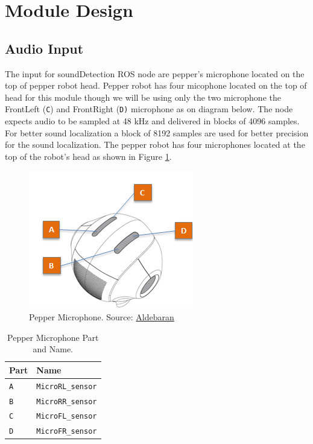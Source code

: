 \documentclass{CSSRforAfrica}
\begin{document}
\section{Module Design}
\subsection*{Audio Input}
The input for soundDetection ROS node are pepper's microphone located on the top of pepper robot head. Pepper robot has four micophone located on the top of head for this module though we will be using only the two microphone the FrontLeft (\texttt{C}) and FrontRight (\texttt{D)} microphone as on diagram below. The node expects audio to be sampled at 48 kHz and delivered in blocks of 4096 samples. For better sound localization a block of 8192 samples are used for better precision for the sound localization.
The pepper robot has four microphones located at the top of the robot's head as shown in Figure \ref{fig:Microphone}. 
\begin{figure}[!hbpt]
	\centering
	\includegraphics[scale=0.90]{images/Pepper_Microphone.png}
	\caption{Pepper Microphone. Source: \href{http://doc.aldebaran.com/2-5/family/pepper_technical/microphone_pep.html}{Aldebaran}}
	\label{fig:Microphone}
\end{figure}

\begin{longtable}[c]{|p{1.5cm}|p{6cm}|}
	\caption{Pepper Microphone Part and Name.} \label{tab:microphone_part_name}\\
	\hline
	\rowcolor{gray!30}
	\textbf{Part} & \textbf{Name} \\ \hline
	\endhead %
	\large{\texttt{A}} & \large{\texttt{MicroRL\_sensor}} \\ \hline
	\large{\texttt{B}} & \large{\texttt{MicroRR\_sensor}} \\ \hline
	\large{\texttt{C}} & \large{\texttt{MicroFL\_sensor}} \\ \hline
	\large{\texttt{D}} & \large{\texttt{MicroFR\_sensor}} \\ \hline
\end{longtable}
\end{document}
